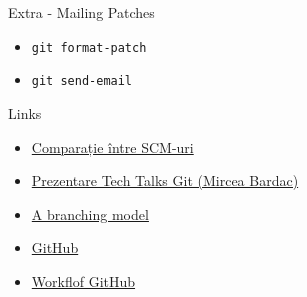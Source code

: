 \documentclass{beamer}
\begin{document}
\begin{frame}{Extra - Mailing Patches}
  \begin{itemize}
    \item \texttt{git format-patch}
    \item \texttt{git send-email}
  \end{itemize}
\end{frame}

\begin{frame}[label=l]{Links}
  \begin{itemize}
    \item \href{http://en.wikipedia.org/wiki/Comparison_of_revision_control_software}{Comparație între SCM-uri}
    \item \href{http://talks.rosedu.org/prezentari/prezentarea03}{Prezentare
    Tech Talks Git (Mircea Bardac)}
    \item \href{http://nvie.com/posts/a-successful-git-branching-model/}{A
    branching model}
    \item \href{http://github.com}{GitHub}
    \item
    \href{http://www.eqqon.com/index.php/Collaborative_Github_Workflow}{Workflof
    GitHub}
  \end{itemize}
\end{frame}
\end{document}
